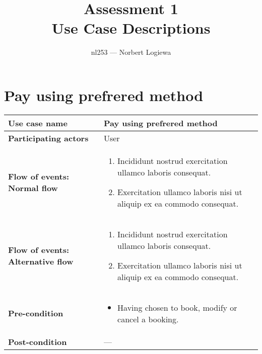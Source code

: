 \documentclass[a4paper, 13pt, draft]{report}
\author{nl253 --- Norbert Logiewa}
\title{%
    \huge{\bf{Assessment 1}} \\ 
    Use Case Descriptions \\ 
}
\begin{document}
\maketitle

\newcommand{\usecasetable}[1]{%
    \mathbb{#1}
}

\section*{Pay using prefrered method}

\begin{center}
    \begin{tabular}{| >{\bf}l | p{5.55cm} |} 
	\hline
	Use case name & Pay using prefrered method \\ 
	\hline
	Participating actors & User \\
	\hline
	Flow of events: Normal flow & 
	\begin{enumerate}		
	    \item Incididunt nostrud exercitation ullamco laboris consequat.
	    \item Exercitation ullamco laboris nisi ut aliquip ex ea commodo consequat.
	\end{enumerate}	\\
	\hline
	Flow of events: Alternative flow &
	\begin{enumerate}		
	    \item Incididunt nostrud exercitation ullamco laboris consequat.
	    \item Exercitation ullamco laboris nisi ut aliquip ex ea commodo consequat.
	\end{enumerate}	\\
	\hline
	Pre-condition & 
	    \begin{itemize} 
		\item Having chosen to book, modify or cancel a booking. 
	    \end{itemize} \\
	\hline
	Post-condition & --- \\
	\hline
    \end{tabular}
\end{center}
\end{document}

